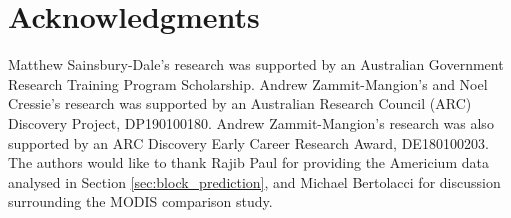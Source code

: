 \documentclass[nojss]{jss}
\begin{document}
\section*{Acknowledgments}

Matthew Sainsbury-Dale's research was supported by an Australian Government Research Training Program Scholarship.
Andrew Zammit-Mangion's and Noel Cressie's research was supported by an Australian Research Council (ARC) Discovery Project, DP190100180. Andrew Zammit-Mangion's research was also supported by an ARC Discovery Early Career Research Award, DE180100203.  
The authors would like to thank Rajib Paul for providing the Americium data analysed in Section \ref{sec:block_prediction}, 
and Michael Bertolacci for discussion surrounding the MODIS comparison study.















\end{document}
